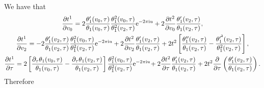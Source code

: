 \documentclass[10pt,a4paper]{amsart}
\numberwithin{equation}{section}
\begin{document}
We have that
\begin{gather*}
\frac{\partial t^1}{\partial v_0}=2\frac{\theta_1^{\prime}(v_0,\tau)}{\theta_1(v_0,\tau)} \frac{\theta_1^2(v_0,\tau)}{\theta_1^2(v_2,\tau)}{\rm e}^{-2\pi {\rm i} u} +2\frac{\partial t^2}{\partial v_0}\frac{\theta_1^{\prime}(v_2,\tau)}{\theta_1(v_2,\tau)},
\\
\frac{\partial t^1}{\partial v_2}=-2\frac{\theta_1^{\prime}(v_2,\tau)}{\theta_1(v_2,\tau)} \frac{\theta_1^2(v_0,\tau)}{\theta_1^2(v_2,\tau)}{\rm e}^{-2\pi {\rm i} u} +2\frac{\partial t^2}{\partial v_2}\frac{\theta_1^{\prime}(v_2,\tau)}{\theta_1(v_2,\tau)} +2t^2\left[\frac{\theta_1^{\prime\prime}(v_2,\tau)}{\theta_1(v_2,\tau)} -\frac{\theta_1^{\prime^2}(v_2,\tau)}{\theta_1^2(v_2,\tau)}\right],
\\
\frac{\partial t^1}{\partial \tau}=2\left[\frac{\partial_{\tau}\theta_1(v_0,\tau)}{\theta_1(v_0,\tau)} -\frac{\partial_{\tau}\theta_1(v_2,\tau)}{\theta_1(v_2,\tau)}\right] \frac{\theta_1^2(v_0,\tau)}{\theta_1^2(v_2,\tau)}{\rm e}^{-2\pi {\rm i} u}\!+2\frac{\partial t^2}{\partial \tau}\frac{\theta_1^{\prime}(v_2,\tau)}{\theta_1(v_2,\tau)}
+2t^2\frac{\partial}{\partial \tau}\left(\frac{\theta_1^{\prime}(v_2,\tau)}{\theta_1(v_2,\tau)}\right).
\end{gather*}
Therefore
\end{document}
